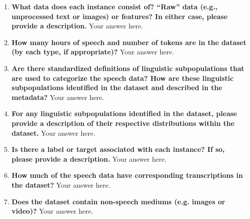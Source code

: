 \documentclass{article}
\begin{document}
\begin{enumerate}[leftmargin=0.65cm]
        \item \textbf{What data does each instance consist of? “Raw” data (e.g., unprocessed text or images) or features? In either case, please provide a description.}
         \newline 
        Your answer here.
        \newline 
        
        \item \textbf{How many hours of speech and number of tokens are in the dataset (by each type, if appropriate)?} 
        \newline 
        Your answer here.
        \newline 
        
        \item \textbf{Are there standardized definitions of linguistic subpopulations that are used to categorize the speech data? How are these linguistic subpopulations identified in the dataset and described in the metadata?}
        \newline 
        Your answer here.
        \newline 
        
        \item \textbf{For any linguistic subpopulations identified in the dataset, please provide a description of their respective distributions within the dataset.}
        \newline 
        Your answer here.
        \newline 
        
        \item \textbf{Is there a label or target associated with each instance? If so, please provide a description.}
        \newline 
        Your answer here.
        \newline 
        
        \item \textbf{How much of the speech data have corresponding transcriptions in the dataset?}
        \newline 
        Your answer here.
        \newline 
        
        \item \textbf{Does the dataset contain non-speech mediums (e.g. images or video)?}
        \newline 
        Your answer here.
        \newline 
        

\end{enumerate}
\end{document}
